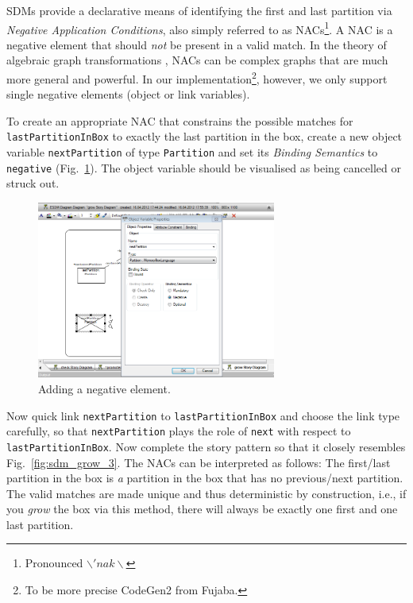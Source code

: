 SDMs provide a declarative means of identifying the first and last
partition via \emph{Negative Application Conditions}, also simply
referred to as \mbox{NACs}\footnote{Pronounced $\backslash 'nak \backslash$}.
A \mbox{NAC} is a negative element that should \emph{not} be present in a valid
match.  In the theory of algebraic graph transformations \cite{EEPT06},
\mbox{NACs} can be complex graphs that are much more general and powerful.  In
our implementation\footnote{To be more precise CodeGen2 from Fujaba.}, however,
we only support single negative elements (object or link variables).

To create an appropriate \mbox{NAC} that constrains the possible matches for
\texttt{lastPartitionInBox} to exactly the last partition in the box, create a
new object variable \texttt{nextPartition} of type \texttt{Partition} and set
its \emph{Binding Semantics} to \texttt{negative} (Fig.~\ref{fig:sdm_grow_2}).  
The object variable should be visualised as being cancelled or struck out.
 
\begin{figure}[htbp]
\begin{center}
  \includegraphics[width=0.7\textwidth]{pics/sdmBilder/grow/sdm58RAW}
  \caption{Adding a negative element.}  
  \label{fig:sdm_grow_2}
\end{center}
\end{figure}
 
Now quick link \texttt{nextPartition} to \texttt{lastPartitionInBox} and choose
the link type carefully, so that \texttt{nextPartition} plays the role of
\texttt{next} with respect to \texttt{lastPartitionInBox}.  Now complete the
story pattern so that it closely resembles Fig.~\ref{fig:sdm_grow_3}.  The
\mbox{NACs} can be interpreted as follows:  The first/last partition in the box
is \emph{a} partition in the box that has no previous/next partition.  The
valid matches are made unique and thus deterministic by construction, i.e., if
you \emph{grow} the box via this method, there will always be exactly one first
and one last partition.  
\clearpage

